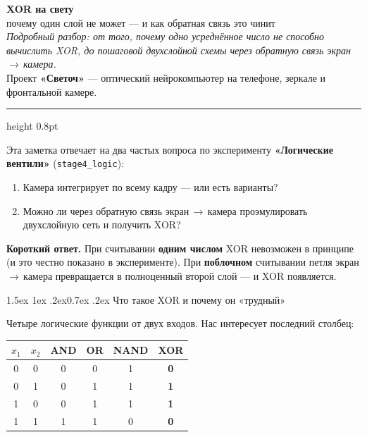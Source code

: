 \documentclass[11pt]{article}
\makeatletter
\renewcommand\section{\@startsection{section}{1}{\z@}%
  {1.5ex \@plus 1ex \@minus .2ex}{0.7ex \@plus.2ex}%
  {\sffamily\Large\bfseries\color{accent}}}
\newenvironment{keybox}
 {\begin{lrbox}{\keybuf}\begin{minipage}{\dimexpr\linewidth-2\fboxsep-2\fboxrule}}
 {\end{minipage}\end{lrbox}%
  \par\smallskip\noindent
  \setlength{\fboxsep}{9pt}\setlength{\fboxrule}{0.9pt}%
  \fcolorbox{accent}{soft}{\usebox{\keybuf}}\par\smallskip}
\makeatother
\begin{document}
\begin{center}
{\sffamily\bfseries\fontsize{22}{26}\selectfont\color{accent}
XOR на свету}\\[4pt]
{\sffamily\large почему один слой не может — и как обратная связь это чинит}\\[10pt]
{\itshape\small Подробный разбор: от того, почему одно усреднённое число не способно
вычислить XOR, до пошаговой двухслойной схемы через обратную связь экран\,$\to$\,камера.}\\[2pt]
{\small Проект \textbf{«Светоч»} — оптический нейрокомпьютер на телефоне, зеркале и фронтальной камере.}
\end{center}

\vspace{0.4em}
\hrule height 0.8pt
\vspace{0.9em}

\noindent Эта заметка отвечает на два частых вопроса по эксперименту
\textbf{«Логические вентили»} (\texttt{stage4\_logic}):

\begin{enumerate}
\item Камера интегрирует по всему кадру — или есть варианты?
\item Можно ли через обратную связь экран\,$\to$\,камера проэмулировать двухслойную
сеть и получить XOR?
\end{enumerate}

\begin{keybox}
\textbf{Короткий ответ.} При считывании \textbf{одним числом} XOR невозможен в
принципе (и это честно показано в эксперименте). При \textbf{поблочном}
считывании петля экран\,$\to$\,камера превращается в полноценный второй слой —
и XOR появляется.
\end{keybox}

\section{Что такое XOR и почему он «трудный»}

Четыре логические функции от двух входов. Нас интересует последний столбец:

\begin{center}
\begin{tabular}{cc|cccc}
\toprule
$x_1$ & $x_2$ & AND & OR & NAND & \textbf{XOR}\\
\midrule
0 & 0 & 0 & 0 & 1 & \textbf{0}\\
0 & 1 & 0 & 1 & 1 & \textbf{\color{accent2}1}\\
1 & 0 & 0 & 1 & 1 & \textbf{\color{accent2}1}\\
1 & 1 & 1 & 1 & 0 & \textbf{0}\\
\bottomrule
\end{tabular}
\end{center}
\end{document}
